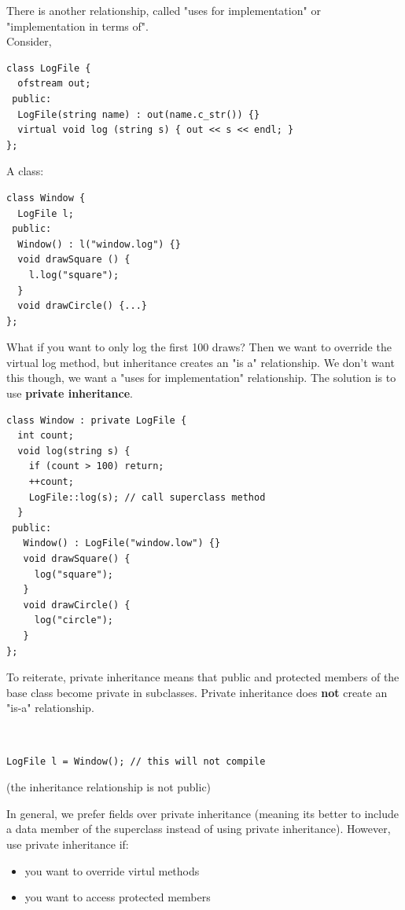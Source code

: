 \documentclass[english, 11pt]{article}
\begin{document}
There is another relationship, called "uses for implementation" or "implementation in terms of". \\

Consider,
\begin{lstlisting}
class LogFile {
  ofstream out;
 public:
  LogFile(string name) : out(name.c_str()) {}
  virtual void log (string s) { out << s << endl; }
};
\end{lstlisting}
A  class:
\begin{lstlisting}
class Window {
  LogFile l;
 public:
  Window() : l("window.log") {}
  void drawSquare () {
    l.log("square");
  }
  void drawCircle() {...}
};
\end{lstlisting}
What if you want to only log the first 100 draws? Then we want to override the virtual log method, but inheritance creates an "is a" relationship. We don't want this though, we want a "uses for implementation" relationship. The solution is to use \textbf{private inheritance}.

\begin{lstlisting}
class Window : private LogFile {
  int count;
  void log(string s) {
    if (count > 100) return;
    ++count;
    LogFile::log(s); // call superclass method
  }
 public:
   Window() : LogFile("window.low") {}
   void drawSquare() {
     log("square");
   }
   void drawCircle() {
     log("circle");
   }
};
\end{lstlisting}

To reiterate, private inheritance means that public and protected members of the base class become private in subclasses. Private inheritance does \textbf{not} create an "is-a" relationship.

\begin{exmp} \
  \begin{lstlisting}
LogFile l = Window(); // this will not compile
  \end{lstlisting}
  (the inheritance relationship is not public)
\end{exmp}

In general, we prefer fields over private inheritance (meaning its better to include a data member of the superclass instead of using private inheritance). However, use private inheritance if:
\begin{itemize}
  \item you want to override virtul methods
  \item you want to access protected members
\end{itemize}
\end{document}
